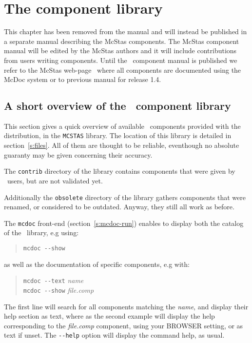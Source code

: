 
\chapter{The component library}
\label{s:components}

This chapter has been removed from the manual and will instead be published 
in a separate manual describing the McStas components. The McStas component manual will be edited by the McStas authors and it will include contributions from users writing components. Until the \MCS\ component manual is published we refer to the McStas web-page~\cite{mcstas_webpage} where all components are documented using the McDoc system or to previous manual for 
release 1.4.

\section{A short overview of the \MCS\ component library}
\label{s:comp-overview}

This section gives a quick overview of available \MCS\ components
provided with the distribution, in the \verb+MCSTAS+ library. The
location of this library is detailed in section~\ref{s:files}. All of them are thought to be reliable, eventhough no absolute guaranty may be given concerning their accuracy.

The \verb+contrib+ directory of the library contains components that were given by \MCS\ users, but are not validated yet. 

Additionally the \verb+obsolete+ directory of the library gathers components that were renamed, or considered to be outdated. Anyway, they still all work as before.

The \verb+mcdoc+ front-end (section~\ref{s:mcdoc-run}) enables to display both the 
catalog of the \MCS\ library, e.g using: 
\begin{quote}
  \verb|mcdoc --show|
\end{quote}
as well as the documentation of specific components, e.g with:
\begin{quote}
  \verb|mcdoc --text| {\it name} \\
  \verb|mcdoc --show| {\it file.comp}
\end{quote}
The first line will search for all components matching the {\it name}, and display their help section as text, where as the second example will display the help corresponding to the {\it file.comp} component, using your BROWSER setting, or as text if unset. The \verb+--help+ option will display the command help, as usual.

